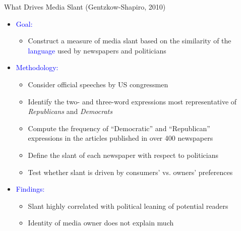 \documentclass[english]{beamer}
\begin{document}
\begin{frame}{What Drives Media Slant (Gentzkow-Shapiro, 2010)}
\begin{itemize}
\setlength{\itemsep}{0.9em}

\item{\textcolor{blue}{\large Goal:}
\vspace*{5pt}
\begin{itemize}
\setlength{\itemsep}{0.5em}
\setlength{\itemindent}{-1em}
\item{Construct a measure of media slant based on the similarity of the \\
\hspace{-10pt}\textcolor{blue}{language} used by newspapers and politicians}
\end{itemize}}

\pause

\item{\textcolor{blue}{\large Methodology:}
\vspace*{5pt}
\begin{itemize}
\setlength{\itemsep}{0.5em}
\setlength{\itemindent}{-1em}
\item{Consider official speeches by US congressmen}
\item{Identify the two- and three-word expressions most representative of\\
\hspace{-10pt}\textit{Republicans} and \textit{Democrats}}
\item{Compute the frequency of ``Democratic'' and ``Republican'' \\
\hspace{-10pt}expressions in the articles published in over 400 newspapers}
\item Define the slant of each newspaper with respect to politicians
\item Test whether slant is driven by consumers' vs. owners' preferences
\end{itemize}}

\pause

\item{\textcolor{blue}{\large Findings:}
\vspace*{5pt}
\begin{itemize}
\setlength{\itemsep}{0.5em}
\setlength{\itemindent}{-1em}
\item{Slant highly correlated with political leaning of potential readers}
\item{Identity of media owner does not explain much} 
\end{itemize}}
\end{itemize}
\end{frame}
\end{document}
